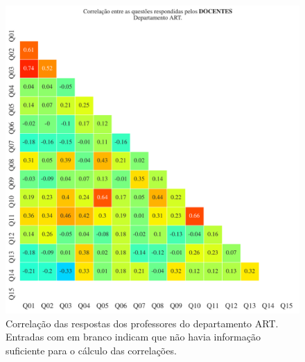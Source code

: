 \documentclass[a4paper,10pt]{article}
\begin{document}
\begin{figure}[h]
\centering
\includegraphics[width=0.999\linewidth]{matriz_corr__ART_docentes.png}
\caption{\label{fig:corr_docentes}Correlação das respostas dos professores do departamento ART. Entradas com em branco indicam que não havia informação suficiente para o cálculo das correlações.}
\end{figure}
\end{document}
